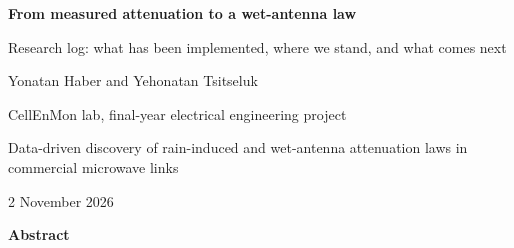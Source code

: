 \documentclass[11pt,a4paper]{article}
\begin{document}
\thispagestyle{plain}

\begin{center}
{\LARGE\sffamily\bfseries From measured attenuation to a wet-antenna law\par}
\vspace{0.6em}
{\large\sffamily Research log: what has been implemented, where we stand, and what comes next\par}
\vspace{0.8em}
{\large Yonatan Haber and Yehonatan Tsitseluk\par}
\vspace{0.3em}
CellEnMon lab, final-year electrical engineering project\par
Data-driven discovery of rain-induced and wet-antenna attenuation laws in commercial microwave links\par
\vspace{0.6em}
2 November 2026
\end{center}

\vspace{1em}
\begin{center}{\sffamily\bfseries Abstract}\end{center}
\end{document}

